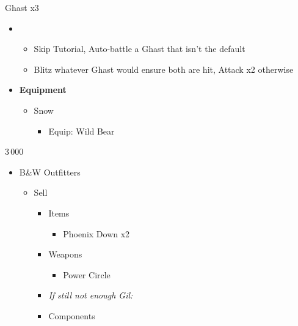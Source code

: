 \begin{paracol}{2}
	\begin{battle}{Ghast x3}
		\begin{itemize}
			\item \first
			      \begin{itemize}
				      \item Skip Tutorial, Auto-battle a Ghast that isn't the default
				      \item Blitz whatever Ghast would ensure both are hit, Attack x2 otherwise
			      \end{itemize}
		\end{itemize}
	\end{battle}
	\switchcolumn*
	\begin{menu}
		\begin{itemize}
			\item \textbf{Equipment}
			      \begin{itemize}
				      \item Snow
				            \begin{itemize}
					            \item Equip: Wild Bear
				            \end{itemize}
			      \end{itemize}
		\end{itemize}
	\end{menu}
	\switchcolumn
	\switchcolumn*
	\begin{shop}{3\,000}
		\begin{itemize}
			\item B\&W Outfitters
			      \begin{itemize}
				      \item Sell
				            \begin{itemize}
					            \item Items
					                  \begin{itemize}
						                  \item Phoenix Down x2
					                  \end{itemize}
					            \item Weapons
					                  \begin{itemize}
						                  \item Power Circle
					                  \end{itemize}
					            \item \textit{If still not enough Gil:}
					            \item Components

\end{itemize}
\end{itemize}
\end{itemize}
\end{shop}
\end{paracol}
